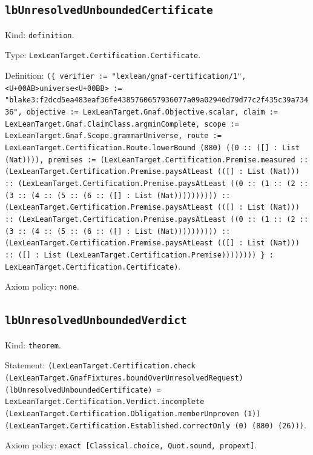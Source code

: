 \documentclass[11pt]{article}
\begin{document}
\subsection*{\texttt{lbUnresolvedUnboundedCertificate}}
\noindent Kind: \texttt{definition}.\par
\noindent Type: \texttt{LexLeanTarget.Certification.Certificate}.\par
\noindent Definition: \texttt{(\{ verifier := "lexlean/gnaf-certification/1", <U+00AB>universe<U+00BB> := "blake3:f2dcd5ea483eaf36fe4385760657936077a09a02940d79d77c2f435c39a73436", objective := LexLeanTarget.Gnaf.Objective.scalar, claim := LexLeanTarget.Gnaf.ClaimClass.argminComplete, scope := LexLeanTarget.Gnaf.Scope.grammarUniverse, route := LexLeanTarget.Certification.Route.lowerBound (880) ((0 :: ([] : List (Nat)))), premises := (LexLeanTarget.Certification.Premise.measured :: (LexLeanTarget.Certification.Premise.paysAtLeast (([] : List (Nat))) :: (LexLeanTarget.Certification.Premise.paysAtLeast ((0 :: (1 :: (2 :: (3 :: (4 :: (5 :: (6 :: ([] : List (Nat)))))))))) :: (LexLeanTarget.Certification.Premise.paysAtLeast (([] : List (Nat))) :: (LexLeanTarget.Certification.Premise.paysAtLeast ((0 :: (1 :: (2 :: (3 :: (4 :: (5 :: (6 :: ([] : List (Nat)))))))))) :: (LexLeanTarget.Certification.Premise.paysAtLeast (([] : List (Nat))) :: ([] : List (LexLeanTarget.Certification.Premise)))))))) \} : LexLeanTarget.Certification.Certificate)}.\par
\noindent Axiom policy: \texttt{none}.\par
\subsection*{\texttt{lbUnresolvedUnboundedVerdict}}
\noindent Kind: \texttt{theorem}.\par
\noindent Statement: \texttt{(LexLeanTarget.Certification.check (LexLeanTarget.GnafFixtures.boundOverUnresolvedRequest) (lbUnresolvedUnboundedCertificate) = LexLeanTarget.Certification.Verdict.incomplete (LexLeanTarget.Certification.Obligation.memberUnproven (1)) (LexLeanTarget.Certification.Established.correctOnly (0) (880) (26)))}.\par
\noindent Axiom policy: \texttt{exact [Classical.choice, Quot.sound, propext]}.\par
\end{document}
